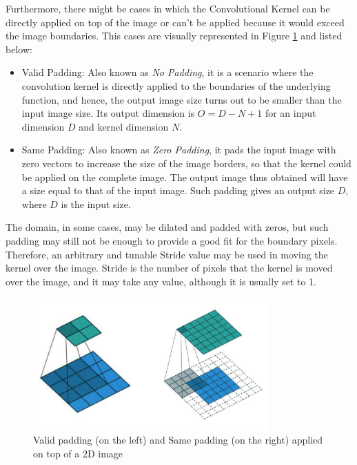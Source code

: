 Furthermore, there might be cases in which the Convolutional Kernel can be directly applied on top of the image or can't be applied because it would exceed the image boundaries. This cases are visually represented in Figure \ref{fig:Padding} and listed below:
\begin{itemize}
    \item Valid Padding: Also known as \textit{No Padding}, it is a scenario where the convolution kernel is directly applied to the boundaries of the underlying function, and hence, the output image size turns out to be smaller than the input image size. Its output dimension is $O = D - N + 1$ for an input dimension $D$ and kernel dimension $N$.
    \item Same Padding: Also known as \textit{Zero Padding}, it pads the input image with zero vectors to increase the size of the image borders, so that the kernel could be applied on the complete image. The output image thus obtained will have a size equal to that of the input image. Such padding gives an output size $D$, where $D$ is the input size.
\end{itemize}

The domain, in some cases, may be dilated and padded with zeros, but such padding may still not be enough to provide a good fit for the boundary pixels. Therefore, an arbitrary and tunable Stride value may be used in moving the kernel over the image. Stride is the number of pixels that the kernel is moved over the image, and it may take any value, although it is usually set to 1.

\begin{figure}[ht!]
    \centering
    \includegraphics[width=0.8\textwidth]{images/Padding.jpg}
    \caption[Padding algorithms]{Valid padding (on the left) and Same padding (on the right) applied on top of a 2D image}
    \label{fig:Padding}
\end{figure}

